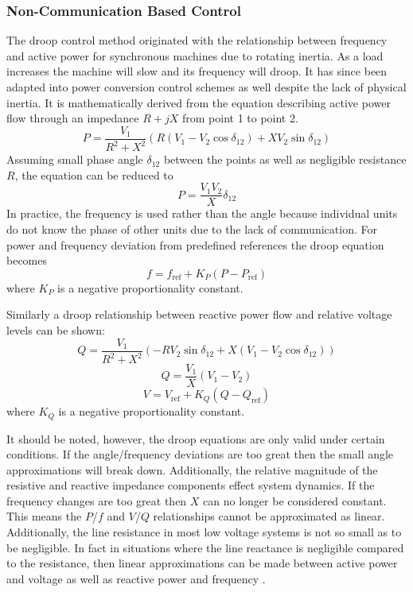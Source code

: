 \subsubsection{Non-Communication Based Control}
The droop control method originated with the relationship between frequency and active power for synchronous machines due to rotating inertia. As a load increases the machine will slow and its frequency will droop. It has since been adapted into power conversion control schemes as well despite the lack of physical inertia. It is mathematically derived from the equation describing active power flow through an impedance $ R + jX $ from point 1 to point 2.
\begin{equation}
P = \frac{V_{1}}{R^2 + X^2} \left( R \left( V_{1}-V_{2}\cos{\delta_{12}} \right) +X V_{2} \sin{\delta_{12}} \right)
\end{equation}
Assuming small phase angle $\delta_{12}$ between the points as well as negligible resistance $R$, the equation can be reduced to 
\begin{equation}
P = \frac{V_1V_2}{X}\delta_{12}
\end{equation}
In practice, the frequency is used rather than the angle because individual units do not know the phase of other units due to the lack of communication. For power and frequency deviation from predefined references the droop equation becomes
\begin{equation}
f = f_{\text{ref}} + K_P\left(P - P_{\text{ref}}\right)
\end{equation}
where $K_P$ is a negative proportionality constant.

Similarly a droop relationship between reactive power flow and relative voltage levels can be shown:
\begin{equation}
Q = \frac{V_1}{R^2 + X^2} \left( -R V_2 \sin{\delta_{12}} + X \left(V_1 - V_2 \cos{\delta_{12}}\right) \right)
\end{equation}
\begin{equation}
Q = \frac{V_1}{X} \left( V_1 - V_2 \right)
\end{equation}
\begin{equation}
V = V_{\text{ref}} + K_Q \left( Q - Q_{\text{ref}} \right)
\end{equation}
where $K_Q$ is a negative proportionality constant. 

It should be noted, however, the droop equations are only valid under certain conditions. If the angle/frequency deviations are too great then the small angle approximations will break down. Additionally, the relative magnitude of the resistive and reactive impedance components effect system dynamics. If the frequency changes are too great then $X$ can no longer be considered constant. This means the $P$/$f$ and $V$/$Q$ relationships cannot be approximated as linear. Additionally, the line resistance in most low voltage systems is not so small as to be negligible. In fact in situations where the line reactance is negligible compared to the resistance, then linear approximations can be made between active power and voltage as well as reactive power and frequency \cite{YunWeiLi2009}.


